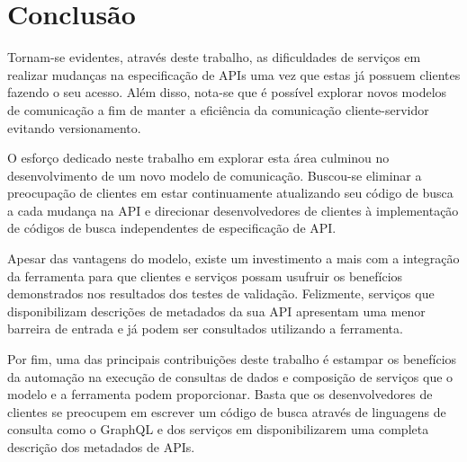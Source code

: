 \chapter{Conclusão}

Tornam-se evidentes, através deste trabalho, as dificuldades de serviços em realizar mudanças na especificação de APIs uma vez que estas já possuem clientes fazendo o seu acesso. Além disso, nota-se que é possível explorar novos modelos de comunicação a fim de manter a eficiência da comunicação cliente-servidor evitando versionamento.

O esforço dedicado neste trabalho em explorar esta área culminou no desenvolvimento de um novo modelo de comunicação. Buscou-se eliminar a preocupação de clientes em estar continuamente atualizando seu código de busca a cada mudança na API e direcionar desenvolvedores de clientes à implementação de códigos de busca independentes de especificação de API.

Apesar das vantagens do modelo, existe um investimento a mais com a integração da ferramenta para que clientes e serviços possam usufruir os benefícios demonstrados nos resultados dos testes de validação. Felizmente, serviços que disponibilizam descrições de metadados da sua API apresentam uma menor barreira de entrada e já podem ser consultados utilizando a ferramenta.

Por fim, uma das principais contribuições deste trabalho é estampar os benefícios da automação na execução de consultas de dados e composição de serviços que o modelo e a ferramenta podem proporcionar. Basta que os desenvolvedores de clientes se preocupem em escrever um código de busca através de linguagens de consulta como o GraphQL e dos serviços em disponibilizarem uma completa descrição dos metadados de APIs.


